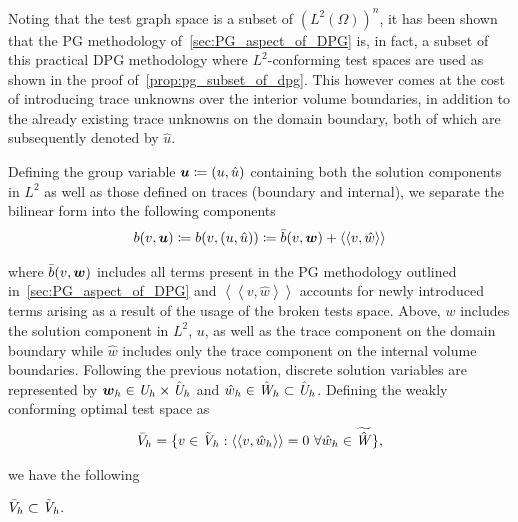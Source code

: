 Noting that the test graph space is a subset of $(L^2(\Omega))^n$, it has been shown that the PG methodology
of~\autoref{sec:PG_aspect_of_DPG} is, in fact, a subset of this practical DPG methodology where $L^2$-conforming test
spaces are used as shown in the proof of~\autoref{prop:pg_subset_of_dpg}. This however comes at the cost of introducing
trace unknowns over the interior volume boundaries, in addition to the already existing trace unknowns on the domain
boundary, both of which are subsequently denoted by $\hat{u}$.

Defining the group variable $\mathit{\bm{{u}}} \coloneqq (u,\hat{u})$ containing both the solution components in $L^2$ as well as
those defined on traces (boundary and internal),
we separate the bilinear form into the following components
\begin{align} \label{eq:bilinear_decomposition}
b(v,\mathit{\bm{{u}}})
\coloneqq b(v,(u,\hat{u})) \coloneqq \bar{b}(v,\mathit{\bm{{w}}}) + \left<\left< v,\hat{w} \right>\right>
\end{align}

where $\bar{b}(v,\mathit{\bm{{w}}})$ includes all terms present in the PG methodology outlined in~\autoref{sec:PG_aspect_of_DPG} and
$\left<\left< v,\hat{w} \right>\right>$ accounts for newly introduced terms arising as a result of the usage of the
broken tests space. Above, $w$ includes the solution component in $L^2$, $u$, as well as the trace component on the
domain boundary while $\hat{w}$ includes only the trace component on the internal volume boundaries. Following the
previous notation, discrete solution variables are represented by $\mathit{\bm{{w}}}_h \in \mathit{{{U}}}_h \times \hat{\mathit{{{U}}}}_h$ and
$\hat{w}_h \in \hat{\mathit{{{W}}}}_h \subset \hat{\mathit{{{U}}}}_h$. Defining the weakly
conforming optimal test space as
\begin{align} \label{eq:weakly_conforming_approx_test_space}
\bar{V}_h = \{ v \in \tilde{\mathit{{{V}}}}_h : \left<\left< v,\hat{w}_h \right>\right> = 0\ \forall \hat{w}_h \in \widetilde{\hat{\mathit{{{W}}}}} \},
\end{align}

we have the following

\begin{proposition} \label{prop:pg_subset_of_dpg}
$\bar{V}_h \subset \tilde{\mathit{{{V}}}}_h.$
\end{proposition}

